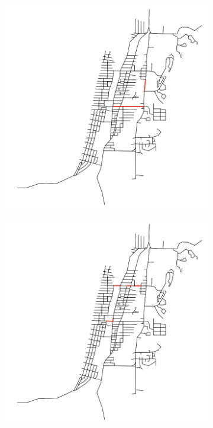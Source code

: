 \begin{figure}
    \centering
    \begin{subfigure}{0.475\textwidth}
        \centering
        \includegraphics[width=\textwidth]{images/analisi/comparison-base-critical-links.png}
        \caption{}
    \end{subfigure}
    \hfill
    \begin{subfigure}{0.475\textwidth}
        \centering
        \includegraphics[width=\textwidth]{images/analisi/comparison-new-critical-links.png}
        \caption{}
    \end{subfigure}
    \caption{}
    \label{fig:analisi-comparison-critical-links2}
\end{figure}


